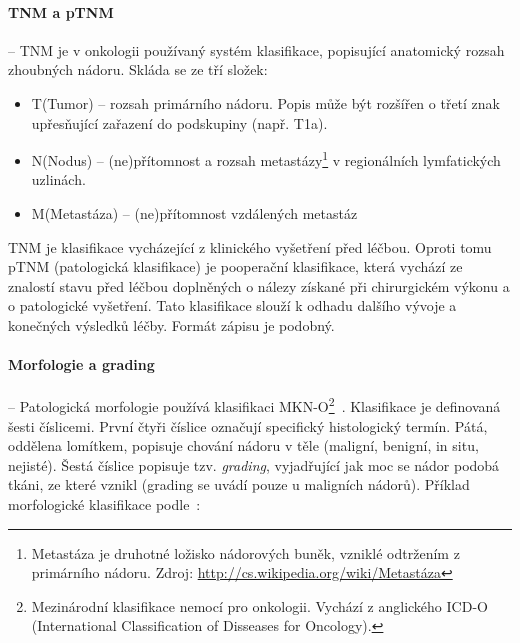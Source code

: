 \paragraph*{TNM a pTNM} -- TNM\cite{TNM} je v onkologii používaný systém klasifikace, popisující anatomický rozsah zhoubných nádoru. Skláda se ze tří složek:
\begin{itemize}
	\item T(Tumor) -- rozsah primárního nádoru. Popis může být rozšířen o třetí znak upřesňující zařazení do podskupiny (např. T1a).
	
	\item N(Nodus) -- (ne)přítomnost a rozsah metastázy\footnote{Metastáza je druhotné ložisko nádorových buněk, vzniklé odtržením z primárního nádoru. Zdroj: \url{http://cs.wikipedia.org/wiki/Metastáza}} v regionálních lymfatických uzlinách.
	\item M(Metastáza) -- (ne)přítomnost vzdálených metastáz
\end{itemize}
TNM je klasifikace vycházející z klinického vyšetření před léčbou. Oproti tomu pTNM (patologická klasifikace) je pooperační klasifikace, která vychází ze znalostí stavu před léčbou doplněných o nálezy získané při chirurgickém výkonu a o patologické vyšetření. Tato klasifikace slouží k odhadu dalšího vývoje a konečných výsledků léčby. Formát zápisu je podobný.

\paragraph*{Morfologie a grading} --
Patologická morfologie používá klasifikaci MKN-O\footnote{Mezinárodní klasifikace nemocí pro onkologii. Vychází z anglického ICD-O (International Classification of Disseases for Oncology).}~\cite{MKN-O}. Klasifikace je definovaná šesti číslicemi. První čtyři číslice označují specifický histologický termín. Pátá, oddělena lomítkem, popisuje chování nádoru v těle (maligní, benigní, in situ, nejisté). Šestá číslice popisuje tzv. \textit{grading}, vyjadřující jak moc se nádor podobá tkáni, ze které vznikl (grading se uvádí pouze u maligních nádorů). Příklad morfologické klasifikace podle~\cite{MKN-O}:

